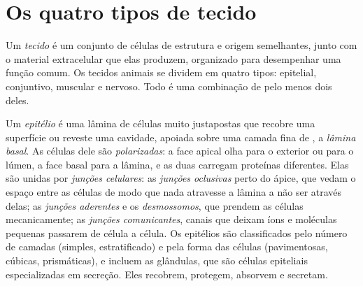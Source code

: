 \section{Os quatro tipos de tecido}

\begin{definition}[Tecido]\label{def:b1:body-plans-tissues:tissue}
Um \emph{tecido} é um conjunto de células de estrutura e
origem semelhantes, junto com o material extracelular que elas produzem,
organizado para desempenhar uma função comum. Os tecidos animais se
dividem em quatro tipos: epitelial, conjuntivo, muscular e nervoso. Todo
 é uma combinação de pelo menos dois deles.
\end{definition}

\begin{definition}\label{def:b1:body-plans-tissues:epithelium}
Um \emph{epitélio} é uma lâmina de células muito
justapostas que recobre uma superfície ou reveste uma cavidade,
apoiada sobre uma camada fina de , a
\emph{lâmina basal}. As células dele são
\emph{polarizadas}: a face apical olha para o
exterior ou para o lúmen, a face basal para a lâmina, e as duas carregam
proteínas diferentes. Elas são unidas por
\emph{junções celulares}: as
\emph{junções oclusivas} perto do ápice, que vedam o espaço entre as
células de modo que nada atravesse a lâmina a não ser através delas; as
\emph{junções aderentes} e os \emph{desmossomos}, que prendem as células
mecanicamente; as \emph{junções comunicantes}, canais que deixam íons e
moléculas pequenas passarem de célula a célula. Os epitélios são
classificados pelo número de camadas (simples, estratificado) e pela
forma das células (pavimentosas, cúbicas, prismáticas), e incluem as
glândulas, que são células epiteliais especializadas em secreção. Eles
recobrem, protegem, absorvem e secretam.
\end{definition}

